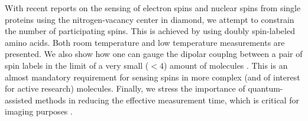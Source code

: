 With recent reports on the sensing of electron spins and nuclear spins
from single proteins using the nitrogen-vacancy center in diamond, we
attempt to constrain the number of participating spins. This is achieved
by using doubly spin-labeled amino acids. Both room temperature and low
temperature measurements are presented. We also show how one can gauge
the dipolar couplng between a pair of spin labels in the limit of a very
small ($<4$) amount of molecules \cite{Schlipf_2017}. This is an almost mandatory
requirement for sensing spins in more complex (and of interest for
active research) molecules. Finally, we stress the importance of
quantum-assisted methods in reducing the effective measurement time,
which is critical for imaging purposes \cite{H_berle_2017}.